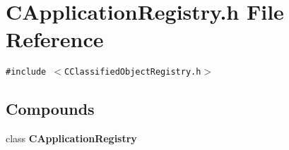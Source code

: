 \section{CApplication\-Registry.h File Reference}
\label{CApplicationRegistry_8h}
{\tt \#include $<$CClassified\-Object\-Registry.h$>$}\par
\subsection*{Compounds}
\begin{CompactItemize}
\item 
class {\bf CApplication\-Registry}
\end{CompactItemize}

